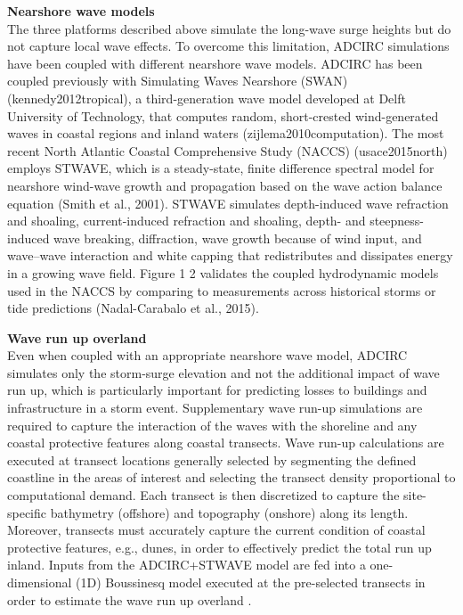\noindent\textbf{Nearshore wave models} \\The three platforms described above simulate the long-wave surge heights but do not capture local wave effects. To overcome this limitation, ADCIRC simulations have been coupled with different nearshore wave models. ADCIRC has been coupled previously with Simulating Waves Nearshore (SWAN) (kennedy2012tropical), a third-generation wave model developed at Delft University of Technology, that computes random, short-crested wind-generated waves in coastal regions and inland waters (zijlema2010computation). The most recent North Atlantic Coastal Comprehensive Study (NACCS) (usace2015north) employs STWAVE, which is a steady-state, finite difference spectral model for nearshore wind-wave growth and propagation based on the wave action balance equation (Smith et al., 2001). STWAVE simulates depth-induced wave refraction and shoaling, current-induced refraction and shoaling, depth- and steepness-induced wave breaking, diffraction, wave growth because of wind input, and wave–wave interaction and white capping that redistributes and dissipates energy in a growing wave field. Figure 1 2 validates the coupled hydrodynamic models used in the NACCS by comparing to measurements across historical storms or tide predictions (Nadal-Carabalo et al., 2015). 
\newline

\noindent\textbf{Wave run up overland} \\Even when coupled with an appropriate nearshore wave model, ADCIRC simulates only the storm-surge elevation and not the additional impact of wave run up, which is particularly important for predicting losses to buildings and infrastructure in a storm event. Supplementary wave run-up simulations are required to capture the interaction of the waves with the shoreline and any coastal protective features along coastal transects. Wave run-up calculations are executed at transect locations generally selected by segmenting the defined coastline in the areas of interest and selecting the transect density proportional to computational demand. Each transect is then discretized to capture the site-specific bathymetry (offshore) and topography (onshore) along its length. Moreover, transects must accurately capture the current condition of coastal protective features, e.g., dunes, in order to effectively predict the total run up inland. Inputs from the ADCIRC+STWAVE model are fed into a one-dimensional (1D) Boussinesq model executed at the pre-selected transects in order to estimate the wave run up overland \citep{demirbilek_2009}. 
\newline

